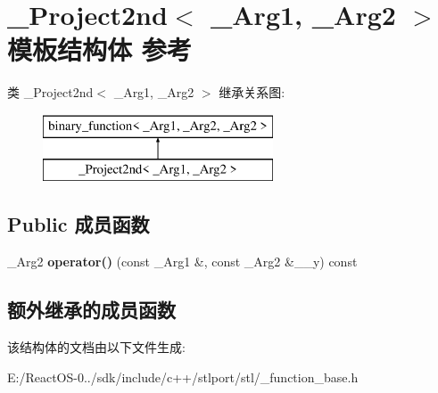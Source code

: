 \hypertarget{struct___project2nd}{}\section{\+\_\+\+Project2nd$<$ \+\_\+\+Arg1, \+\_\+\+Arg2 $>$ 模板结构体 参考}
\label{struct___project2nd}
类 \+\_\+\+Project2nd$<$ \+\_\+\+Arg1, \+\_\+\+Arg2 $>$ 继承关系图\+:\begin{figure}[H]
\begin{center}
\leavevmode
\includegraphics[height=2.000000cm]{struct___project2nd}
\end{center}
\end{figure}
\subsection*{Public 成员函数}
\begin{DoxyCompactItemize}
\item 
\mbox{\label{struct___project2nd_aac8234eee62b3da67ffd339f14d498d8}} 
\+\_\+\+Arg2 {\bfseries operator()} (const \+\_\+\+Arg1 \&, const \+\_\+\+Arg2 \&\+\_\+\+\_\+y) const
\end{DoxyCompactItemize}
\subsection*{额外继承的成员函数}


该结构体的文档由以下文件生成\+:\begin{DoxyCompactItemize}
\item 
E\+:/\+React\+O\+S-\/0../sdk/include/c++/stlport/stl/\+\_\+function\+\_\+base.\+h\end{DoxyCompactItemize}
